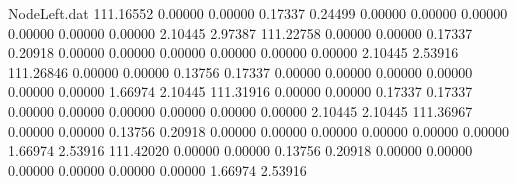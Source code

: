 \begin{filecontents}{NodeLeft.dat}
 111.16552    0.00000    0.00000     0.17337    0.24499    0.00000    0.00000    0.00000    0.00000    0.00000    0.00000    2.10445    2.97387
 111.22758    0.00000    0.00000     0.17337    0.20918    0.00000    0.00000    0.00000    0.00000    0.00000    0.00000    2.10445    2.53916
 111.26846    0.00000    0.00000     0.13756    0.17337    0.00000    0.00000    0.00000    0.00000    0.00000    0.00000    1.66974    2.10445
 111.31916    0.00000    0.00000     0.17337    0.17337    0.00000    0.00000    0.00000    0.00000    0.00000    0.00000    2.10445    2.10445
 111.36967    0.00000    0.00000     0.13756    0.20918    0.00000    0.00000    0.00000    0.00000    0.00000    0.00000    1.66974    2.53916
 111.42020    0.00000    0.00000     0.13756    0.20918    0.00000    0.00000    0.00000    0.00000    0.00000    0.00000    1.66974    2.53916
\end{filecontents}
